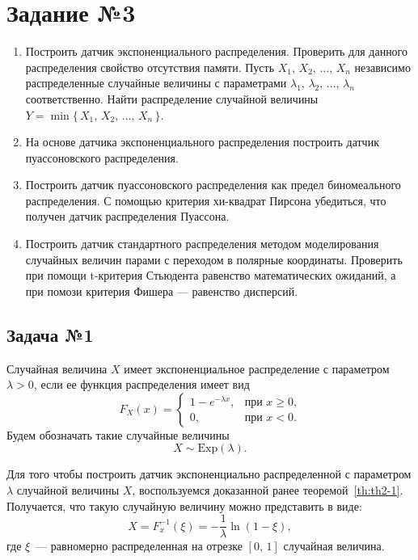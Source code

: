\section{Задание №3}

\begin{enumerate}
        \item Построить датчик экспоненциального распределения. 
        Проверить для данного распределения свойство отсутствия памяти. Пусть $X_1,\,X_2,\,\ldots,\,X_n$ независимо распределенные случайные величины с параметрами $\lambda_1,\,\lambda_2,\,\ldots,\,\lambda_n$ соответственно. 
        Найти распределение случайной величины $Y = \min\{\,X_1,\,X_2,\,\ldots,\,X_n\,\}$.
        \item На основе датчика экспоненциального распределения построить датчик пуассоновского распределения.
        \item Построить датчик пуассоновского распределения как предел биномеального распределения.
        С помощью критерия хи-квадрат Пирсона убедиться, что получен датчик распределения Пуассона.
        \item Построить датчик стандартного распределения методом моделирования случайных величин парами с переходом в полярные координаты. Проверить при помощи t-критерия Стьюдента равенство математических ожиданий, а при помози критерия Фишера --- равенство дисперсий.
\end{enumerate}

\subsection{Задача №1}

\begin{definition}
        Случайная величина $X$ имеет экспоненциальное распределение с параметром $\lambda > 0$, если ее функция распределения имеет вид
$$
        F_X(x) = 
        \begin{cases}
                1 - e^{-\lambda x},& \mbox{при $x \geqslant 0$,} \\
                0, & \mbox{при $x < 0$.}
        \end{cases}
$$
        Будем обозначать такие случайные величины
$$
        X \sim \mbox{Exp}(\lambda).
$$
\end{definition}

Для того чтобы построить датчик экспоненциально распределенной с параметром $\lambda$ случайной величины $X$, воспользуемся доказанной ранее теоремой~\ref{th:th2-1}. Получается, что такую случайную величину можно представить в виде:
$$
        X =
        F_x^{-1}(\xi) =
        -\frac{1}{\lambda}\ln(1 - \xi),
$$
где $\xi$~--- равномерно распределенная на отрезке $[0,\,1]$ случайная величина.

